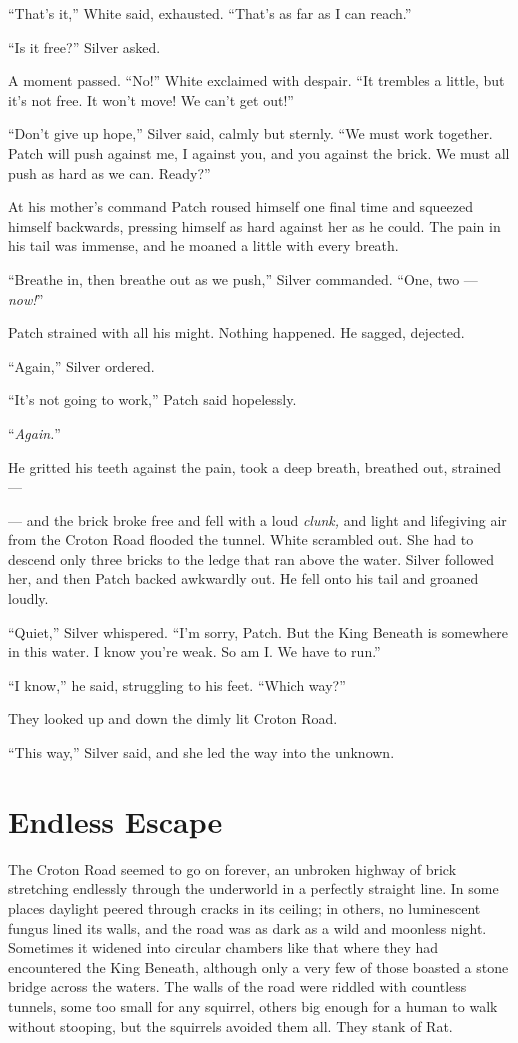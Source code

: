 \documentclass[ebook,oneside,openany,12pt]{memoir}
\begin{document}
“That’s it,” White said, exhausted. “That’s as far as I can reach.”

“Is it free?” Silver asked.

A moment passed. “No!” White exclaimed with despair. “It trembles a
little, but it’s not free. It won’t move! We can’t get out!”

“Don’t give up hope,” Silver said, calmly but sternly. “We must work
together. Patch will push against me, I against you, and you against
the brick. We must all push as hard as we can. Ready?”

At his mother’s command Patch roused himself one final time and
squeezed himself backwards, pressing himself as hard against her as he
could. The pain in his tail was immense, and he moaned a little with
every breath.

“Breathe in, then breathe out as we push,” Silver commanded. “One, two
— \emph{now!}”

Patch strained with all his might. Nothing happened. He sagged,
dejected.

“Again,” Silver ordered.

“It’s not going to work,” Patch said hopelessly.

“\emph{Again.}”

He gritted his teeth against the pain, took a deep breath, breathed
out, strained —

— and the brick broke free and fell with a loud \emph{clunk,} and
light and lifegiving air from the Croton Road flooded the
tunnel. White scrambled out. She had to descend only three bricks to
the ledge that ran above the water. Silver followed her, and then
Patch backed awkwardly out. He fell onto his tail and groaned loudly.

“Quiet,” Silver whispered. “I’m sorry, Patch. But the King Beneath is
somewhere in this water. I know you’re weak. So am I. We have to run.”

“I know,” he said, struggling to his feet. “Which way?”

They looked up and down the dimly lit Croton Road.

“This way,” Silver said, and she led the way into the unknown.


\section{Endless Escape}

The Croton Road seemed to go on forever, an unbroken highway of brick
stretching endlessly through the underworld in a perfectly straight
line. In some places daylight peered through cracks in its ceiling; in
others, no luminescent fungus lined its walls, and the road was as
dark as a wild and moonless night. Sometimes it widened into circular
chambers like that where they had encountered the King Beneath,
although only a very few of those boasted a stone bridge across the
waters. The walls of the road were riddled with countless tunnels,
some too small for any squirrel, others big enough for a human to walk
without stooping, but the squirrels avoided them all. They stank of
Rat.
\end{document}
